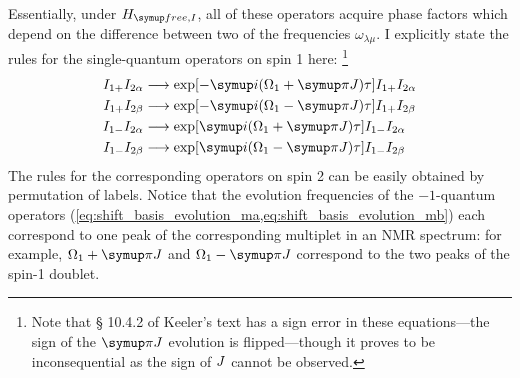 Essentially, under $\HfreeI$, all of these operators acquire phase factors which depend on the difference between two of the frequencies $\omega_{\lambda\mu}$.
I explicitly state the rules for the single-quantum operators on spin 1 here:%
\footnote{Note that \S{} 10.4.2 of Keeler's text\autocite{Keeler2010} has a sign error in these equations---the sign of the $\cpi J\/$ evolution is flipped---though it proves to be inconsequential as the sign of $J\/$ cannot be observed.}
\begin{align}
    I_{1+}I_{2\alpha} &\longrightarrow \exp[-\mi(\Omega_1 + \cpi J)\tau] I_{1+}I_{2\alpha} \label{eq:shift_basis_evolution_pa} \\
    I_{1+}I_{2\beta} &\longrightarrow \exp[-\mi(\Omega_1 - \cpi J)\tau] I_{1+}I_{2\beta} \label{eq:shift_basis_evolution_pb} \\
    I_{1-}I_{2\alpha} &\longrightarrow \exp[\mi(\Omega_1 + \cpi J)\tau] I_{1-}I_{2\alpha} \label{eq:shift_basis_evolution_ma} \\
    I_{1-}I_{2\beta} &\longrightarrow \exp[\mi(\Omega_1 - \cpi J)\tau] I_{1-}I_{2\beta} \label{eq:shift_basis_evolution_mb}
\end{align}
The rules for the corresponding operators on spin 2 can be easily obtained by permutation of labels.
Notice that the evolution frequencies of the $-1$-quantum operators (\cref{eq:shift_basis_evolution_ma,eq:shift_basis_evolution_mb}) each correspond to one peak of the corresponding multiplet in an NMR spectrum: for example, $\Omega_1 + \cpi J\/$ and $\Omega_1 - \cpi J\/$ correspond to the two peaks of the spin-1 doublet.

